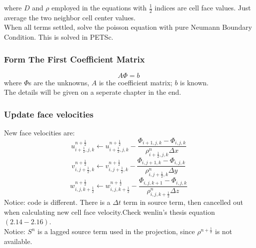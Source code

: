 \documentclass{article}
\numberwithin{equation}{subsection}
\begin{document}
where $D$ and $\rho$ employed in the equations with $\frac{1}{2}$ indices are cell face values. Just average the two neighbor cell center values.\\
When all terms settled, solve the poisson equation with pure Neumann Boundary Condition. This is solved in PETSc.



\subsubsection{Form The First Coefficient Matrix}
\begin{equation}
A \Phi = b
\end{equation}
where $\Phi$s are the unknowns, $A$ is the coefficient matrix; $b$ is known.\\
The details will be given on a seperate chapter in the end.\\




\subsubsection{Update face velocities}
New face velocities are:
\begin{equation}
u^{n+\frac{1}{2}}_{i+\frac{1}{2},j,k} \leftarrow u^{n+\frac{1}{2}}_{i+\frac{1}{2},j,k} - \frac{\Phi_{i+1,j,k} - \Phi_{i,j,k}}{\rho^n_{i+\frac{1}{2},j,k} \Delta x}
\end{equation}
\begin{equation}
v^{n+\frac{1}{2}}_{i,j+\frac{1}{2},k} \leftarrow v^{n+\frac{1}{2}}_{i,j+\frac{1}{2},k} - \frac{\Phi_{i,j+1,k} - \Phi_{i,j,k}}{\rho^n_{i,j+\frac{1}{2},k} \Delta y}
\end{equation}
\begin{equation}
w^{n+\frac{1}{2}}_{i,j,k+\frac{1}{2}} \leftarrow w^{n+\frac{1}{2}}_{i,j,k+\frac{1}{2}} - \frac{\Phi_{i,j,k+1} - \Phi_{i,j,k}}{\rho^n_{i,j,k+\frac{1}{2}} \Delta z}
\end{equation}
Notice: code is different. There is a $\Delta t$ term in source term, then cancelled out when calculating new cell face velocity.Check wenlin's thesis equation $(2.14-2.16)$. \\
Notice: $S^n$ is a lagged source term used in the projection, since $\rho^{n+\frac{1}{2}}$ is not available.
\end{document}
